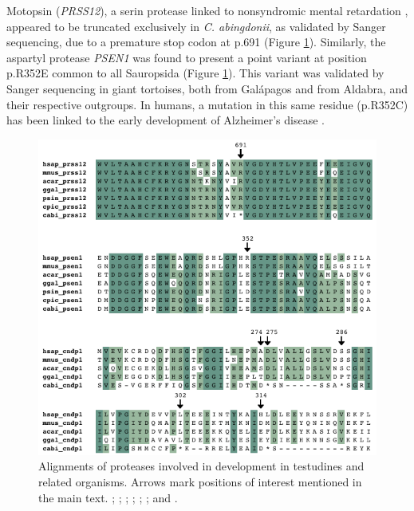 Motopsin (\textit{PRSS12}), a serin protease linked to nonsyndromic mental retardation \cite{Mitsui2013}, appeared to be truncated exclusively in \textit{C. abingdonii}, as validated by Sanger sequencing, due to a premature stop codon at {p.691} (Figure \ref{f_results_george_degradome_alignment_development}).
Similarly, the aspartyl protease \textit{PSEN1} was found to present a point variant at position {p.R352E} common to all Sauropsida (Figure \ref{f_results_george_degradome_alignment_development}). This variant was validated by Sanger sequencing in giant tortoises, both from Gal\'{a}pagos and from Aldabra, and their respective outgroups.
In humans, a mutation in this same residue ({p.R352C}) has been linked to the early development of Alzheimer's disease \cite{Jiang2015,Ryazantseva2016}.

\begin{figure}[t!]
    \begin{center}
        \includegraphics[width=\textwidth]{figures/alignment_development.pdf}
        \caption[Alignments of proteases related to development in testudines]{\footnotesize Alignments of proteases involved in development in testudines and related organisms. Arrows mark positions of interest mentioned in the main text. \hsap; \mmus; \acar; \ggal; \psin; \cpic; and \cabi.}
        \label{f_results_george_degradome_alignment_development}
    \end{center}
\end{figure}

